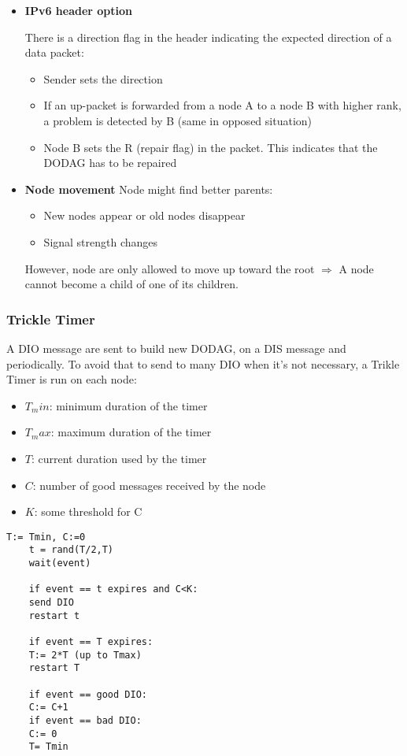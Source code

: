 \begin{itemize}
    \item \textbf{IPv6 header option}

        There is a direction flag in the header indicating the expected direction
        of a data packet:
        \begin{itemize}
            \item Sender sets the direction
            \item If an up-packet is forwarded from a node A to a node B with 
                higher rank, a problem is detected by B (same in opposed situation)
            \item Node B sets the R (repair flag) in the packet. This indicates
                that the DODAG has to be repaired
        \end{itemize}

    \item \textbf{Node movement}
        Node might find better parents:
        \begin{itemize}
            \item New nodes appear or old nodes disappear
            \item Signal strength changes
        \end{itemize}
        However, node are only allowed to move up toward the root $\Rightarrow$ A node
        cannot become a child of one of its children.
\end{itemize}

\subsubsection{Trickle Timer}
A DIO message are sent to build new DODAG, on a DIS message and
periodically. To avoid that to send to many DIO when it's not necessary,
a Trikle Timer is run on each node:

\begin{itemize}
    \item $T_min$: minimum duration of the timer
    \item $T_max$: maximum duration of the timer
    \item $T$: current duration used by the timer
    \item $C$: number of good messages received by the node
    \item $K$: some threshold for C
\end{itemize}

\begin{small}
    \begin{lstlisting}[frame=single]
    T:= Tmin, C:=0
    t = rand(T/2,T)
    wait(event)

    if event == t expires and C<K:
    send DIO 
    restart t

    if event == T expires:
    T:= 2*T (up to Tmax)
    restart T

    if event == good DIO:
    C:= C+1
    if event == bad DIO:
    C:= 0
    T= Tmin
    \end{lstlisting}
\end{small}

